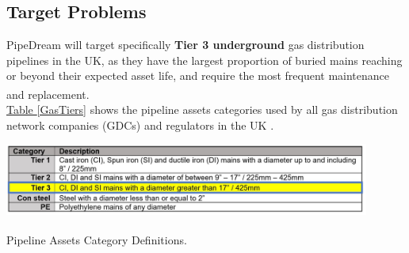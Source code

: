 \documentclass[11pt]{article}		%
\newcommand{\supercite}[1]{\textsuperscript{\cite{#1}}}		%
\newcommand{\tableref}[1]{\hyperref[#1]{Table \ref*{#1}}}     %
\begin{document}
	\subsection[Target Problems]{Target Problems}
	
	PipeDream will target specifically \textbf{Tier 3 underground} gas distribution pipelines in the UK, as they have the largest proportion of buried mains reaching or beyond their expected asset life, and require the most frequent maintenance and replacement\supercite{sönnichsen_5_2021}.\\
	\tableref{GasTiers} shows the pipeline assets categories used by all gas distribution network companies (GDCs) and regulators in the UK .
		\begin{table}[h]
			\centering
			\includegraphics[width=0.9\textwidth]{GasTiers}
			\caption{Pipeline Assets Category Definitions\supercite{ltd}.}
			\label{GasTiers}
 		\end{table}
 	\vspace{-0.5cm}
 	
\end{document}
